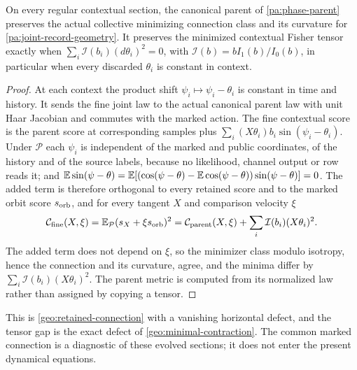 On every regular contextual section, the canonical parent of \cref{pa:phase-parent} preserves the actual collective minimizing connection class and its curvature for \cref{pa:joint-record-geometry}. It preserves the minimized contextual Fisher tensor exactly when $\sum_i\mathcal I(b_i)(d\theta_i)^2=0$, with $\mathcal I(b)=bI_1(b)/I_0(b)$, in particular when every discarded $\theta_i$ is constant in context.
\begin{proof}
At each context the product shift $\psi_i\mapsto\psi_i-\theta_i$ is constant in time and history. It sends the fine joint law to the actual canonical parent law with unit Haar Jacobian and commutes with the marked action. The fine contextual score is the parent score at corresponding samples plus $\sum_i(X\theta_i)b_i\sin(\psi_i-\theta_i)$. Under $\mathcal P$ each $\psi_i$ is independent of the marked and public coordinates, of the history and of the source labels, because no likelihood, channel output or row reads it; and $\mathbb E\sin(\psi-\theta)=\mathbb E[(\cos(\psi-\theta)-\mathbb E\cos(\psi-\theta))\sin(\psi-\theta)]=0$. The added term is therefore orthogonal to every retained score and to the marked orbit score $s_{\rm orb}$, and for every tangent $X$ and comparison velocity $\xi$
\begin{equation}
 \mathcal C_{\rm fine}(X,\xi)
 =\mathbb E_{\mathcal P}(s_X+\xi s_{\rm orb})^2
 =\mathcal C_{\rm parent}(X,\xi)+\sum_i\mathcal I(b_i)(X\theta_i)^2.
 \label{pa:cost-isometry}
\end{equation}
The added term does not depend on $\xi$, so the minimizer class modulo isotropy, hence the connection and its curvature, agree, and the minima differ by $\sum_i\mathcal I(b_i)(X\theta_i)^2$. The parent metric is computed from its normalized law rather than assigned by copying a tensor.
\end{proof}

This is \cref{geo:retained-connection} with a vanishing horizontal defect, and the tensor gap is the exact defect of \cref{geo:minimal-contraction}. The common marked connection is a diagnostic of these evolved sections; it does not enter the present dynamical equations.

